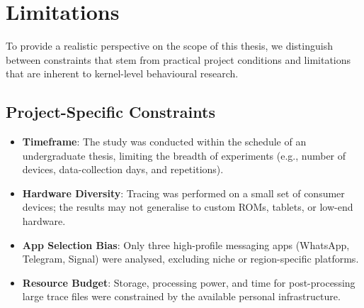 \documentclass[a4paper,12pt]{report}
\begin{document}
\vspace{0.5em}
\noindent{}

\vspace{0.5em}
\noindent{}

\vspace{0.5em}
\noindent{}


\section{Limitations}

To provide a realistic perspective on the scope of this thesis, we distinguish between
constraints that stem from practical project conditions and limitations that are
inherent to kernel-level behavioural research.

\subsection*{Project-Specific Constraints}

\begin{itemize}
    \item \textbf{Timeframe}: The study was conducted within the schedule of an
    undergraduate thesis, limiting the breadth of experiments (e.g., number of
    devices, data-collection days, and repetitions).
    \item \textbf{Hardware Diversity}: Tracing was performed on a small set of
    consumer devices; the results may not generalise to custom ROMs, tablets, or
    low-end hardware.
    \item \textbf{App Selection Bias}: Only three high-profile messaging apps
    (WhatsApp, Telegram, Signal) were analysed, excluding niche or region-specific platforms.
    \item \textbf{Resource Budget}: Storage, processing power, and time for
    post-processing large trace files were constrained by the available personal
    infrastructure.
\end{itemize}
\end{document}
